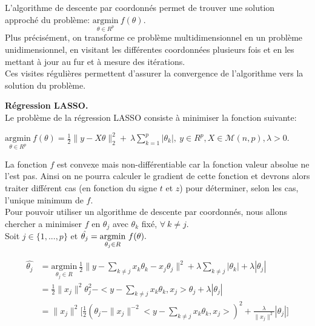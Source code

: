 \documentclass{article}
\begin{document}
L'algorithme de descente par coordonnés permet de trouver une solution approché du problème: $\underset{\theta\in R^p}{\mathrm{argmin}} \ f(\theta).$  \\

Plus précisément, on transforme ce problème multidimensionnel en un problème unidimensionnel, en visitant les différentes coordonnées plusieurs fois et en les mettant à jour au fur et à mesure des itérations.\\
Ces visites régulières permettent d'assurer la convergence de l'algorithme vers la solution du problème.

\newpage 

\textbf{Régression LASSO.} \\

Le problème de la régression LASSO consiste à minimiser la fonction suivante: 

\begin{center}
$\underset{\theta\in R^p}{\mathrm{argmin}} \ f(\theta)=\frac{1}{2} {\| y - X\theta\|_2^2} + \ \lambda \sum_{k=1}^{p} |\theta_k|
, \ y \in R^p,X \in \mathcal{M}(n,p),\lambda > 0.
 $
\end{center}

La fonction $f$ est convexe mais non-différentiable car la fonction valeur absolue ne l'est pas.
Ainsi on ne pourra calculer le gradient de cette fonction et devrons alors traiter différent cas (en fonction du signe $t$ et $z$) pour déterminer, selon les cas, l'unique minimum de $f$.\\

Pour pouvoir utiliser un algorithme de descente par coordonnés, nous allons chercher a minimiser $f$ en $\theta_j$ avec $\theta_k$ fixé, $\forall\ k \ne j$.\\

Soit $j \in \{1, ... ,p \}$ et $ \hat{\theta_j} = \underset{\theta_j\in R}{\mathrm{argmin}} \ f(\theta). \\ $ 

\begin{align*}
\hat{\theta_j} &= \underset{\theta_j\in R}{\mathrm{argmin}}     \ \frac{1}{2} \|y - \sum_{k \ne j} x_k\theta_k  - x_j\theta_j\|^2 + \lambda \sum_{k \ne j}|\theta_k| + \lambda|\theta_j| \\ &= 
\frac{1}{2} \|x_j\|^2\theta_j^2 - <y - \sum_{k \ne j} x_k\theta_k,x_j>\theta_j + \lambda|\theta_j| \\ &=
\|x_j\|^2 \big[\frac{1}{2}(\theta_j - \|x_j\|^{-2}<y - \sum_{k \ne j} x_k\theta_k,x_j>)^2 + \frac{\lambda}{\|x_j\|^2}|\theta_j|]
\end{align*}
\end{document}
